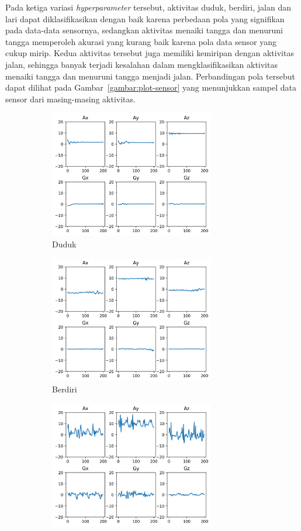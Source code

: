 Pada ketiga variasi \textit{hyperparameter} tersebut, aktivitas duduk, berdiri, jalan dan lari dapat diklasifikasikan dengan baik karena perbedaan pola yang signifikan pada data-data sensornya, sedangkan aktivitas menaiki tangga dan menuruni tangga memperoleh akurasi yang kurang baik karena pola data sensor yang cukup mirip. Kedua aktivitas tersebut juga memiliki kemiripan dengan aktivitas jalan, sehingga banyak terjadi kesalahan dalam mengklasifikasikan aktivitas menaiki tangga dan menuruni tangga menjadi jalan. Perbandingan pola tersebut dapat dilihat pada Gambar~\ref{gambar:plot-sensor} yang menunjukkan sampel data sensor dari masing-masing aktivitas.

\begin{figure}[h!]
    \begin{subfigure}{0.5\textwidth}
        \includegraphics[width=7.2cm]{data/plot-sensor/duduk.png}
        \caption{Duduk}
        \label{gambar:plot-sensor-duduk}
    \end{subfigure}
    \begin{subfigure}{0.5\textwidth}
        \includegraphics[width=7.2cm]{data/plot-sensor/berdiri.png}
        \caption{Berdiri}
        \label{gambar:plot-sensor-berdiri}
    \end{subfigure}
    \begin{subfigure}{0.5\textwidth}
        \includegraphics[width=7.2cm]{data/plot-sensor/berjalan.png}

\end{subfigure}
\end{figure}

